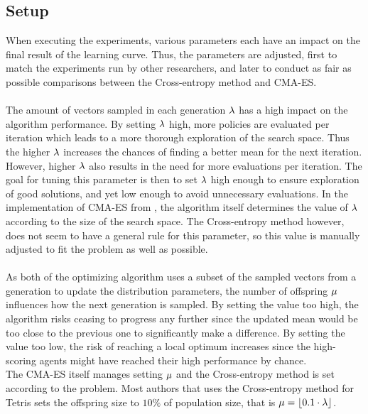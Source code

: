 \subsection{Setup}

When executing the experiments, various parameters each have 
an impact on the final result of the learning curve. Thus, the parameters
are adjusted, first to match the experiments run by other researchers, 
and later to conduct as fair as possible comparisons between 
the Cross-entropy method and CMA-ES.\\
\\
The amount of vectors sampled in each generation $\lambda$
has a high impact on the algorithm performance. By setting $\lambda$
high, more policies are evaluated per iteration which leads to a more thorough 
exploration of the search space. Thus the higher $\lambda$ increases the
chances of finding a better mean for the next iteration.
However, higher $\lambda$ also results in the
need for more evaluations per iteration. The goal for 
tuning this parameter is then
to set $\lambda$ high enough to ensure 
exploration of good solutions, and yet 
low enough to avoid unnecessary evaluations. In the implementation of CMA-ES from \shark , 
the algorithm  itself determines
the value of $\lambda$ according to the 
size of the search space. 
The Cross-entropy method however, does not seem to have a 
general rule for this parameter,
so this value is manually adjusted to fit the 
problem as well as possible.\\
\\
As both of the optimizing algorithm uses a subset of the sampled vectors
from a generation to update the distribution parameters, the number of 
offspring $\mu$ influences how the next generation is sampled.
By setting the value too high, the algorithm risks ceasing to progress any 
further since the updated mean would be too close to the previous one to 
significantly make a difference. By setting the value too low,
the risk of reaching a local optimum increases since the high-scoring agents
might have reached their high performance by chance.\\
The CMA-ES itself manages setting $\mu$ and the Cross-entropy method
is set according to the problem. Most authors that uses the Cross-entropy method for Tetris
sets the offspring size to $10\%$ of population size, that is 
$\mu = \lfloor 0.1 \cdot \lambda \rfloor $.\\
